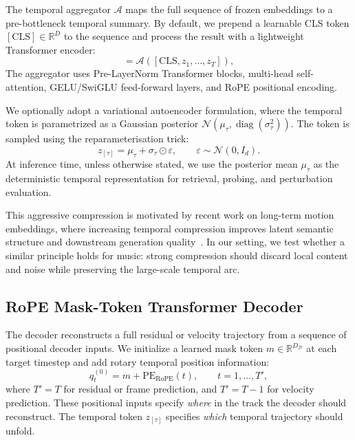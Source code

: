\documentclass{article}
\newcommand{\ztau}{z_{[\tau]}}          %
\newcommand{\R}{\mathbb{R}}
\newcommand{\agg}{\mathcal{A}}          %
\newcommand{\dec}{\mathcal{D}}          %
\newcommand{\pe}{\mathrm{PE}}
\begin{document}
The temporal aggregator $\agg$ maps the full sequence of frozen
embeddings to a pre-bottleneck temporal summary.  By default, we
prepend a learnable CLS token $[\mathrm{CLS}] \in \R^D$ to the sequence and
process the result with a lightweight Transformer encoder:
%
\begin{equation}
  [z_{[\tau]}, h_1, \ldots, h_T]
  =
  \agg\!\left([\mathrm{CLS}, z_1, \ldots, z_T]\right),
  \label{eq:agg}
\end{equation}
%
The aggregator uses Pre-LayerNorm Transformer blocks, multi-head self-attention,
GELU/SwiGLU feed-forward layers, and RoPE positional encoding.

We optionally adopt a variational autoencoder formulation, where
the temporal token is parametrized as a Gaussian posterior
$\mathcal{N}(\mu_\tau,\operatorname{diag}(\sigma_\tau^2))$.  The
token is sampled using the reparameterisation trick:
%
\begin{equation}
  \ztau = \mu_\tau + \sigma_\tau \odot \varepsilon,
  \qquad
  \varepsilon \sim \mathcal{N}(0,I_d).
  \label{eq:reparam}
\end{equation}
%
At inference time, unless otherwise stated, we use the posterior
mean $\mu_\tau$ as the deterministic temporal representation for
retrieval, probing, and perturbation evaluation.

This aggressive compression is motivated by recent work on
long-term motion embeddings, where increasing temporal compression
improves latent semantic structure and downstream generation
quality~\cite{stracke2026learning}.  In our setting, we test
whether a similar principle holds for music: strong compression
should discard local content and noise while preserving the
large-scale temporal arc.

\subsection{RoPE Mask-Token Transformer Decoder}
\label{ssec:decoder}

The decoder reconstructs a full residual or velocity trajectory
from a sequence of positional decoder inputs.  We initialize a
learned mask token $m \in \R^{D_{\dec}}$ at each target timestep
and add rotary temporal position information:
%
\begin{equation}
  q_t^{(0)} = m + \pe_{\mathrm{RoPE}}(t),
  \qquad
  t=1,\ldots,T',
  \label{eq:decoder_time_inputs}
\end{equation}
%
where $T'=T$ for residual or frame prediction, and $T'=T-1$ for
velocity prediction.  These positional inputs specify \emph{where}
in the track the decoder should reconstruct.  The temporal token
$\ztau$ specifies \emph{which} temporal trajectory should unfold.
\end{document}
